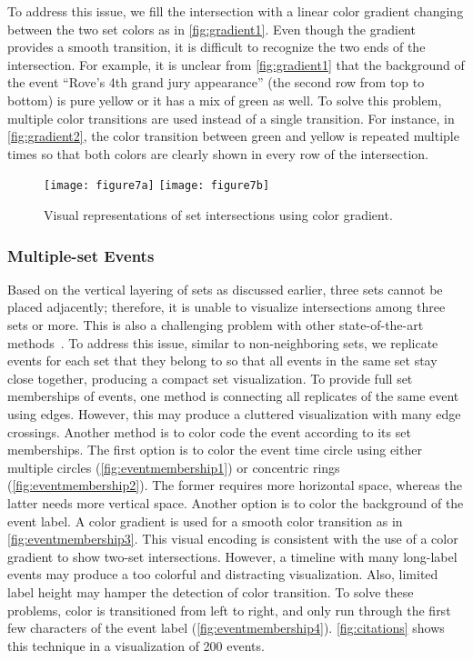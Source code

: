 To address this issue, we fill the intersection with a linear color gradient changing between the two set colors as in \autoref{fig:gradient1}. Even though the gradient provides a smooth transition, it is difficult to recognize the two ends of the intersection. For example, it is unclear from \autoref{fig:gradient1} that the background of the event ``Rove's 4th grand jury appearance'' (the second row from top to bottom) is pure yellow or it has a mix of green as well. To solve this problem, multiple color transitions are used instead of a single transition. For instance, in \autoref{fig:gradient2}, the color transition between green and yellow is repeated multiple times so that both colors are clearly shown in every row of the intersection.

\begin{figure}
	\centering
		{\texttt{[image: figure7a]}}
	\hfill
		{\texttt{[image: figure7b]}}
	\caption{Visual representations of set intersections using color gradient.}
	\label{fig:gradient}
\end{figure}

\subsubsection{Multiple-set Events}
Based on the vertical layering of sets as discussed earlier, three sets cannot be placed adjacently; therefore, it is unable to visualize intersections among three sets or more. This is also a challenging problem with other state-of-the-art methods~\cite{Alsallakh2014}. To address this issue, similar to non-neighboring sets, we replicate events for each set that they belong to so that all events in the same set stay close together, producing a compact set visualization. To provide full set memberships of events, one method is connecting all replicates of the same event using edges. However, this may produce a cluttered visualization with many edge crossings. Another method is to color code the event according to its set memberships. The first option is to color the event time circle using either multiple circles (\autoref{fig:eventmembership1}) or concentric rings (\autoref{fig:eventmembership2}). The former requires more horizontal space, whereas the latter needs more vertical space. Another option is to color the background of the event label. A color gradient is used for a smooth color transition as in \autoref{fig:eventmembership3}. This visual encoding is consistent with the use of a color gradient to show two-set intersections. However, a timeline with many long-label events may produce a too colorful and distracting visualization. Also, limited label height may hamper the detection of color transition. To solve these problems, color is transitioned from left to right, and only run through the first few characters of the event label (\autoref{fig:eventmembership4}). \autoref{fig:citations} shows this technique in a visualization of 200 events.

